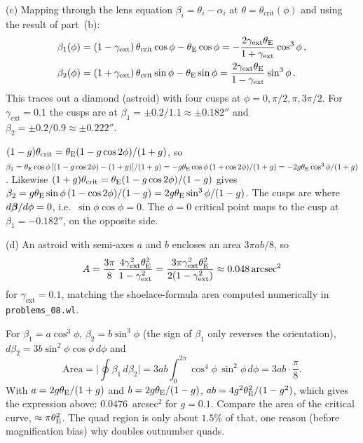 (c) Mapping through the lens equation
$\beta_i = \theta_i - \alpha_i$ at $\theta = \theta_{\mathrm{crit}}(\phi)$
and using the result of part~(b):
\begin{align*}
    \beta_1(\phi) &= (1 - \gamma_{\mathrm{ext}})\,
    \theta_{\mathrm{crit}}\cos\phi - \theta_{\mathrm{E}}\cos\phi
    = -\frac{2\gamma_{\mathrm{ext}}\theta_{\mathrm{E}}}{1 + \gamma_{\mathrm{ext}}}
    \cos^3\phi \,, \\
    \beta_2(\phi) &= (1 + \gamma_{\mathrm{ext}})\,
    \theta_{\mathrm{crit}}\sin\phi - \theta_{\mathrm{E}}\sin\phi
    = \frac{2\gamma_{\mathrm{ext}}\theta_{\mathrm{E}}}{1 - \gamma_{\mathrm{ext}}}
    \sin^3\phi \,.
\end{align*}
This traces out a diamond (astroid) with four cusps at $\phi = 0,
\pi/2, \pi, 3\pi/2$.  For $\gamma_{\mathrm{ext}} = 0.1$ the cusps are at
$\beta_1 = \pm 0.2/1.1 \approx \pm 0.182''$
and $\beta_2 = \pm 0.2/0.9 \approx \pm 0.222''$. \checkmark

\begin{derivation}
$(1-g)\theta_{\mathrm{crit}} = \theta_{\mathrm{E}}(1-g\cos2\phi)/(1+g)$, so
$\beta_1 = \theta_{\mathrm{E}}\cos\phi\,[(1-g\cos2\phi) - (1+g)]/(1+g)
= -g\theta_{\mathrm{E}}\cos\phi\,(1+\cos2\phi)/(1+g) = -2g\theta_{\mathrm{E}}\cos^3\phi/(1+g)$.
Likewise $(1+g)\theta_{\mathrm{crit}} = \theta_{\mathrm{E}}(1-g\cos2\phi)/(1-g)$ gives
$\beta_2 = g\theta_{\mathrm{E}}\sin\phi\,(1-\cos2\phi)/(1-g) = 2g\theta_{\mathrm{E}}\sin^3\phi/(1-g)$.
The cusps are where $d\boldsymbol{\beta}/d\phi = 0$, i.e.\ $\sin\phi\cos\phi = 0$.  The
$\phi = 0$ critical point maps to the cusp at $\beta_1 = -0.182''$, on the
opposite side.
\end{derivation}


(d) An astroid with semi-axes $a$ and $b$ encloses an area
$3\pi ab/8$, so
\begin{equation*}
    A = \frac{3\pi}{8}\,
    \frac{4\gamma_{\mathrm{ext}}^2\theta_{\mathrm{E}}^2}{1 - \gamma_{\mathrm{ext}}^2}
    = \frac{3\pi\gamma_{\mathrm{ext}}^2\theta_{\mathrm{E}}^2}
    {2(1 - \gamma_{\mathrm{ext}}^2)}
    \approx 0.048\,\mathrm{arcsec}^2
\end{equation*}
for $\gamma_{\mathrm{ext}} = 0.1$, matching the shoelace-formula area
computed numerically in \texttt{problems\_08.wl}.

\begin{derivation}
For $\beta_1 = a\cos^3\phi$, $\beta_2 = b\sin^3\phi$ (the sign of $\beta_1$
only reverses the orientation), $d\beta_2 = 3b\sin^2\phi\cos\phi\,d\phi$ and
\[
  \text{Area} = \Big|\oint\beta_1\,d\beta_2\Big|
  = 3ab\int_0^{2\pi}\cos^4\phi\,\sin^2\phi\,d\phi = 3ab\cdot\frac{\pi}{8}.
\]
With $a = 2g\theta_{\mathrm{E}}/(1+g)$ and $b = 2g\theta_{\mathrm{E}}/(1-g)$,
$ab = 4g^2\theta_{\mathrm{E}}^2/(1-g^2)$, which gives the expression above:
$0.0476$~arcsec$^2$ for $g = 0.1$.  Compare the area of the critical curve,
$\approx\pi\theta_{\mathrm{E}}^2$.  The quad region is only about $1.5\%$ of that, one
reason (before magnification bias) why doubles outnumber quads.
\end{derivation}


